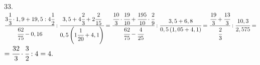 33. $\cfrac{3\cfrac{1}{3}\cdot1,9+19,5:4\cfrac{1}{2}}{\cfrac{62}{75}-0,16}:\cfrac{3,5+4\cfrac{2}{3}+2\cfrac{2}{15}}{0,5\left(1\cfrac{1}{20}+4,1\right)}=
\cfrac{\cfrac{10}{3}\cdot\cfrac{19}{10}+\cfrac{195}{10}\cdot\cfrac{2}{9}}{\cfrac{62}{75}-\cfrac{4}{25}}:\cfrac{3,5+6,8}{0,5\left(1,05+4,1\right)}=
\cfrac{\cfrac{19}{3}+\cfrac{13}{3}}{\cfrac{2}{3}}:\cfrac{10,3}{2,575}=$\\$=
\cfrac{32}{3}\cdot\cfrac{3}{2}:4=4.$\\
